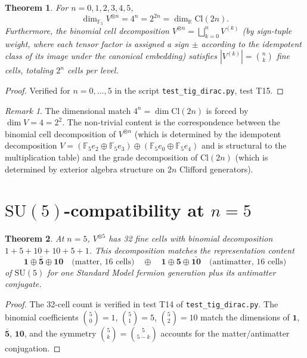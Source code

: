 \documentclass[11pt,reqno]{amsart}
\theoremstyle{plain}
\newtheorem{theorem}{Theorem}[section]
\theoremstyle{definition}
\theoremstyle{remark}
\newtheorem*{remark}{Remark}
\newcommand{\F}{\mathbb{F}}
\newcommand{\R}{\mathbb{R}}
\newcommand{\Cl}{\mathrm{Cl}}
\begin{document}
\begin{theorem}\label{thm:clifford}
For $n = 0, 1, 2, 3, 4, 5$,
\[
\dim_{\F_5} V^{\otimes n} = 4^n = 2^{2n} = \dim_\R \Cl(2n).
\]
Furthermore, the binomial cell decomposition $V^{\otimes n} = \bigsqcup_{k=0}^n V^{(k)}$
(by sign-tuple weight, where each tensor factor is assigned a sign $\pm$
according to the idempotent class of its image under the canonical embedding)
satisfies $|V^{(k)}| = \binom{n}{k}$ fine cells, totaling $2^n$ cells per level.
\end{theorem}

\begin{proof}
Verified for $n=0,\ldots,5$ in the script \texttt{test\_tig\_dirac.py},
test T15.
\end{proof}

\begin{remark}
The dimensional match $4^n = \dim \Cl(2n)$ is forced by $\dim V = 4 = 2^2$.
The non-trivial content is the correspondence between the binomial cell
decomposition of $V^{\otimes n}$ (which is determined by the
idempotent decomposition $V = (\F_5 e_2 \oplus \F_5 e_3) \oplus
(\F_5 e_0 \oplus \F_5 e_4)$ and is structural to the multiplication
table) and the grade decomposition of $\Cl(2n)$ (which is determined by
exterior algebra structure on $2n$ Clifford generators).
\end{remark}

\section{$\mathrm{SU}(5)$-compatibility at $n=5$}
\label{sec:su5}

\begin{theorem}\label{thm:su5}
At $n=5$, $V^{\otimes 5}$ has 32 fine cells with binomial decomposition
$1 + 5 + 10 + 10 + 5 + 1$. This decomposition matches the representation
content
\[
\mathbf{1} \oplus \bar{\mathbf{5}} \oplus \mathbf{10}
\quad \text{(matter, 16 cells)} \quad \oplus \quad
\mathbf{1} \oplus \mathbf{5} \oplus \bar{\mathbf{10}}
\quad \text{(antimatter, 16 cells)}
\]
of $\mathrm{SU}(5)$ for one Standard Model fermion generation plus its
antimatter conjugate.
\end{theorem}

\begin{proof}
The 32-cell count is verified in test T14 of \texttt{test\_tig\_dirac.py}.
The binomial coefficients $\binom{5}{0} = 1$, $\binom{5}{1} = 5$,
$\binom{5}{2} = 10$ match the dimensions of $\mathbf{1}$, $\bar{\mathbf{5}}$,
$\mathbf{10}$, and the symmetry $\binom{5}{k} = \binom{5}{5-k}$ accounts
for the matter/antimatter conjugation.
\end{proof}
\end{document}
